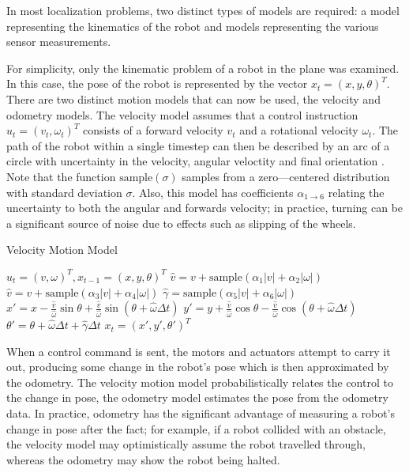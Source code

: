 \documentclass[english]{article}
\begin{document}
In most localization problems, two distinct types of models are required: a model representing the kinematics of the robot and models representing the various sensor measurements. 

For simplicity, only the kinematic problem of a robot in the plane was examined. In this case, the pose of the robot is represented by the vector $x_t = (x,y,\theta)^T$. There are two distinct motion models that can now be used, the velocity and odometry models.
The velocity model assumes that a control instruction $u_t = (v_t, \omega_t)^T$ consists of a forward velocity $v_t$ and a rotational velocity $\omega_t$. The path of the robot within a single timestep can then be described by an arc of a circle with uncertainty in the  velocity, angular veloctity and final orientation \cite{probrob}. Note that the function $\textrm{sample}(\sigma)$ samples from a zero---centered distribution with standard deviation $\sigma$. Also, this model has coefficients $\alpha_{1\rightarrow 6}$ relating the uncertainty to both the angular and forwards velocity; in practice, turning can be a significant source of noise due to effects such as slipping of the wheels.

\begin{algorithm}
\caption{Velocity Motion Model}
\label{alg:velocity_model}
\begin{algorithmic}
	\REQUIRE $u_t = (v, \omega)^T, x_{t-1} = (x, y, \theta)^T $
        \STATE $\hat{v} = v + \textrm{sample}(\alpha_1|v| + \alpha_2|\omega|)$
        \STATE $\hat{v} = v + \textrm{sample}(\alpha_3|v| + \alpha_4|\omega|)$
        \STATE $\hat{\gamma} = \textrm{sample}(\alpha_5|v| + \alpha_6|\omega|)$
        \STATE $x' = x - \frac{\hat{v}}{\hat{\omega}}\sin{\theta} + \frac{\hat{v}}{\hat{\omega}}\sin{(\theta + \hat{\omega} \Delta t)}$
        \STATE $y' = y + \frac{\hat{v}}{\hat{\omega}}\cos{\theta} - \frac{\hat{v}}{\hat{\omega}}\cos{(\theta + \hat{\omega} \Delta t)}$
        \STATE $\theta' = \theta + \hat{\omega}\Delta t + \hat{\gamma}\Delta t$
        \RETURN $x_t = (x', y', \theta')^T$
\end{algorithmic}
\end{algorithm}


When a control command is sent, the motors and actuators attempt to carry it out, producing some change in the robot's pose which is then approximated by the odometry. The velocity motion model probabilistically relates the control to the change in pose, the odometry model estimates the pose from the odometry data. In practice, odometry has the significant advantage of measuring a robot's change in pose after the fact; for example, if a robot collided with an obstacle, the velocity model may optimistically assume the robot travelled through, whereas the odometry may show the robot being halted.
\end{document}
